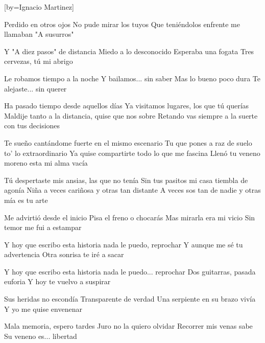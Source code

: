 
[by={Ignacio Martinez}]

    \beginverse
        Perdido en otros ojos
        No pude mirar los tuyos
        Que teniéndolos enfrente
        me llamaban "A susurros"
    \endverse
    
    \beginverse    
        Y "A diez pasos" de distancia
        Miedo a lo desconocido
        Esperaba una fogata
        Tres cervezas, tú mi abrigo
    \endverse
    
    \beginverse    
        Le robamos tiempo a la noche
        Y bailamos... sin saber
        Mas lo bueno poco dura
        Te alejaste... sin querer
    \endverse
    
    \beginverse
        Ha pasado tiempo desde aquellos días
        Ya visitamos lugares, los que tú querías
        Maldije tanto a la distancia, quise que nos sobre
        Retando vas siempre a la suerte con tus decisiones
    \endverse
    
    \beginverse
        Te sueño cantándome fuerte en el mismo escenario
        Tu que pones a raz de suelo to' lo extraordinario
        Ya quise compartirte todo lo que me fascina
        Llenó tu veneno moreno esta mi alma vacía
    \endverse
    
    \beginverse
        Tú despertaste mis ansias, las que no tenía
        Sin tus pasitos mi casa tiembla de agonía
        Niña a veces cariñosa y otras tan distante
        A veces sos tan de nadie y otras mía es tu arte
    \endverse
    
    \beginverse
        Me advirtió desde el inicio
        Pisa el freno o chocarás
        Mas mirarla era mi vicio
        Sin temor me fui a estampar
    \endverse
    
    \beginverse
        Y hoy que escribo esta historia
        nada le puedo, reprochar
        Y aunque me sé tu advertencia
        Otra sonrisa te iré a sacar
    \endverse
    
    \beginverse
        Y hoy que escribo esta historia
        nada le puedo... reprochar
        Dos guitarras, pasada euforia
        Y hoy te vuelvo a suspirar
    \endverse
    
    \beginverse
        Sus heridas no escondía
        Transparente de verdad
        Una serpiente en su brazo vivía
        Y yo me quise envenenar
    \endverse
    
    \beginverse
        Mala memoria, espero tardes
        Juro no la quiero olvidar
        Recorrer mis venas sabe
        Su veneno es... libertad
    \endverse
    

\endsong

\scleardpage